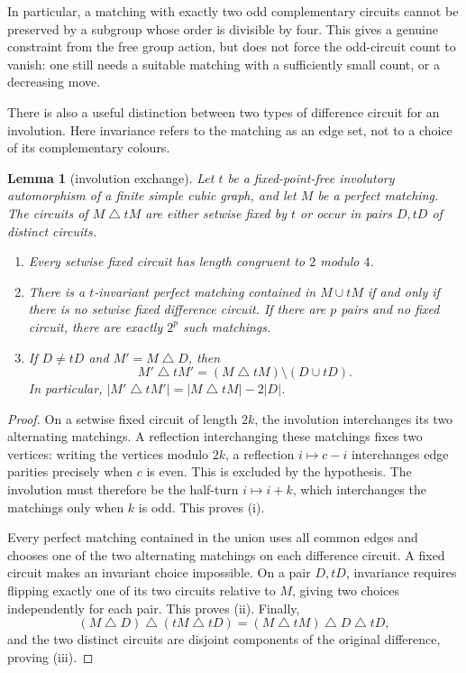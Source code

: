 \documentclass[11pt,a4paper]{article}
\newtheorem{lemma}[theorem]{Lemma}
\theoremstyle{definition}
\theoremstyle{remark}
\begin{document}
In particular, a matching with exactly two odd complementary circuits cannot be preserved by a subgroup whose order is divisible by four.  This gives a genuine constraint from the free group action, but does not force the odd-circuit count to vanish: one still needs a suitable matching with a sufficiently small count, or a decreasing move.

There is also a useful distinction between two types of difference circuit for an involution.  Here invariance refers to the matching as an edge set, not to a choice of its complementary colours.
\begin{lemma}[involution exchange]\label{lem:involution-exchange}
Let $t$ be a fixed-point-free involutory automorphism of a finite simple cubic graph, and let $M$ be a perfect matching.  The circuits of $M\mathbin\triangle tM$ are either setwise fixed by $t$ or occur in pairs $D,tD$ of distinct circuits.
\begin{enumerate}[label=\textup{(\roman*)}]
\item Every setwise fixed circuit has length congruent to $2$ modulo $4$.
\item There is a $t$-invariant perfect matching contained in $M\cup tM$ if and only if there is no setwise fixed difference circuit.  If there are $p$ pairs and no fixed circuit, there are exactly $2^p$ such matchings.
\item If $D\ne tD$ and $M'=M\mathbin\triangle D$, then
\[
 M'\mathbin\triangle tM'
 = (M\mathbin\triangle tM)\setminus(D\cup tD).
\]
In particular, $|M'\mathbin\triangle tM'|=|M\mathbin\triangle tM|-2|D|$.
\end{enumerate}
\end{lemma}
\begin{proof}
On a setwise fixed circuit of length $2k$, the involution interchanges its two alternating matchings.  A reflection interchanging these matchings fixes two vertices: writing the vertices modulo $2k$, a reflection $i\mapsto c-i$ interchanges edge parities precisely when $c$ is even.  This is excluded by the hypothesis.  The involution must therefore be the half-turn $i\mapsto i+k$, which interchanges the matchings only when $k$ is odd.  This proves \textup{(i)}.

Every perfect matching contained in the union uses all common edges and chooses one of the two alternating matchings on each difference circuit.  A fixed circuit makes an invariant choice impossible.  On a pair $D,tD$, invariance requires flipping exactly one of its two circuits relative to $M$, giving two choices independently for each pair.  This proves \textup{(ii)}.  Finally,
\[
 (M\mathbin\triangle D)\mathbin\triangle
 (tM\mathbin\triangle tD)
 = (M\mathbin\triangle tM)\mathbin\triangle D\mathbin\triangle tD,
\]
and the two distinct circuits are disjoint components of the original difference, proving \textup{(iii)}.
\end{proof}
\end{document}
